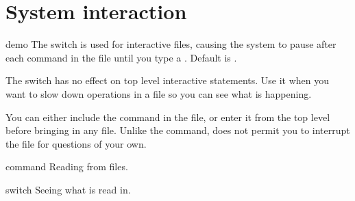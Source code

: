 
\section{System interaction}


\begin{Switch}{demo}
  The  switch is used for interactive files, causing
  the system to pause after each command in the file until you type a
  . Default is .

  \begin{Comments}
    The switch  has no effect on top level interactive
    statements. Use it when you want to slow down operations in a file
    so you can see what is happening.
    
    You can either include the  command in the file,
    or enter it from the top level before bringing in any file. Unlike
    the  command,  does not permit you to
    interrupt the file for questions of your own.
  \end{Comments}
  \begin{Related}
    \item [\name{in} command] Reading from files.
    \item [\name{echo} switch] Seeing what is read in.
  \end{Related}
\end{Switch}

